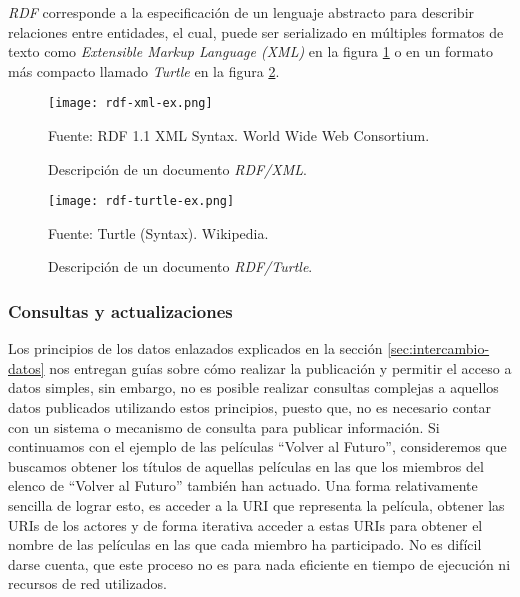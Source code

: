 \textit{RDF} corresponde a la especificación de un lenguaje abstracto para
describir relaciones entre entidades, el cual, puede ser serializado en
múltiples formatos de texto como \textit{Extensible Markup Language (XML)}
\cite{beckett2004rdf} en la figura \ref{fig:rdf-xml-ex} o en un formato más
compacto llamado \textit{Turtle} \cite{beckett2014rdf} en la figura
\ref{fig:rdf-turtle-ex}.

\begin{figure}
    \centering
    \texttt{[image: rdf-xml-ex.png]}
    \caption{Descripción de un documento \textit{RDF/XML}.} Fuente: RDF 1.1 XML
    Syntax. World Wide Web Consortium.
    \label{fig:rdf-xml-ex}
\end{figure}

\begin{figure}
    \centering
    \texttt{[image: rdf-turtle-ex.png]}
    \caption{Descripción de un documento \textit{RDF/Turtle}.} Fuente: Turtle
    (Syntax). Wikipedia.
    \label{fig:rdf-turtle-ex}
\end{figure}

\subsubsection{Consultas y actualizaciones}

Los principios de los datos enlazados explicados en la sección
\ref{sec:intercambio-datos} nos entregan guías sobre cómo realizar la
publicación y permitir el acceso a datos simples, sin embargo, no es posible
realizar consultas complejas a aquellos datos publicados utilizando estos
principios, puesto que, no es necesario contar con un sistema o mecanismo de
consulta para publicar información. Si continuamos con el ejemplo de las
películas ``Volver al Futuro'', consideremos que buscamos obtener los títulos de
aquellas películas en las que los miembros del elenco de ``Volver al Futuro''
también han actuado. Una forma relativamente sencilla de lograr esto, es acceder
a la URI que representa la película, obtener las URIs de los actores y de forma
iterativa acceder a estas URIs para obtener el nombre de las películas en las
que cada miembro ha participado. No es difícil darse cuenta, que este proceso no
es para nada eficiente en tiempo de ejecución ni recursos de red utilizados.


